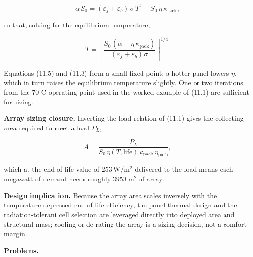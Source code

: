\documentclass[
  11pt,
  openany,
  oneside]{book}
\begin{document}
\begin{equation}
\alpha\,S_0 = (\varepsilon_f + \varepsilon_b)\,\sigma\,T^4 + S_0\,\eta\,\kappa_{\mathrm{pack}}, \tag{11.4}
\end{equation}

so that, solving for the equilibrium temperature,

\begin{equation}
T = \left[\frac{S_0\,(\alpha - \eta\,\kappa_{\mathrm{pack}})}{(\varepsilon_f + \varepsilon_b)\,\sigma}\right]^{1/4}. \tag{11.5}
\end{equation}

Equations (11.5) and (11.3) form a small fixed point: a hotter panel
lowers \(\eta\), which in turn raises the equilibrium temperature
slightly. One or two iterations from the 70 C operating point used in
the worked example of (11.1) are sufficient for sizing.

\textbf{Array sizing closure.} Inverting the load relation of (11.1)
gives the collecting area required to meet a load \(P_L\),

\begin{equation}
A = \frac{P_L}{S_0\,\eta(T,\mathrm{life})\,\kappa_{\mathrm{pack}}\,\eta_{\mathrm{path}}}, \tag{11.6}
\end{equation}

which at the end-of-life value of \(253\ \mathrm{W/m^2}\) delivered to
the load means each megawatt of demand needs roughly
\(3953\ \mathrm{m^2}\) of array.

\textbf{Design implication.} Because the array area scales inversely
with the temperature-depressed end-of-life efficiency, the panel thermal
design and the radiation-tolerant cell selection are leveraged directly
into deployed area and structural mass; cooling or de-rating the array
is a sizing decision, not a comfort margin.

\textbf{Problems.}
\end{document}

